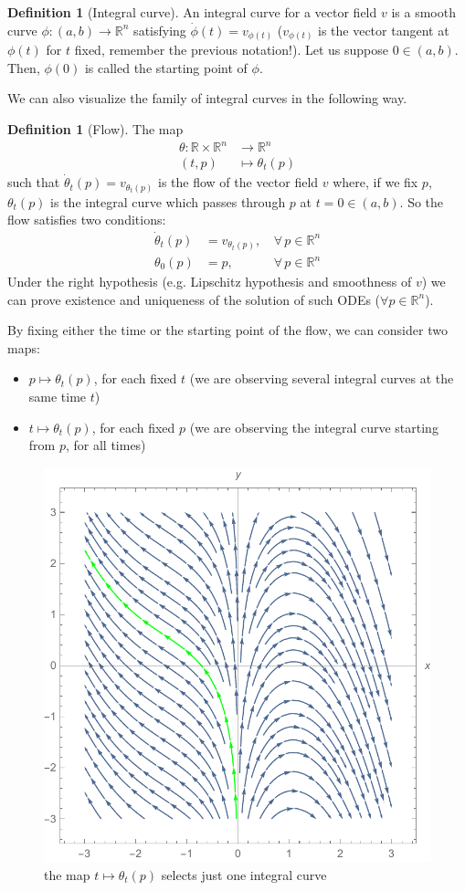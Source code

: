 \documentclass[a4paper,11pt,titlepage]{article}
\numberwithin{equation}{section}
\theoremstyle{definition}
\newtheorem{definition}[theorem]{Definition}
\theoremstyle{remark}
\newcommand{\rfield}{\mathbb{R}}
\begin{document}
\begin{definition}[Integral curve]
  An integral curve for a vector field $v$ is a smooth curve $\phi \colon (a, b) \rightarrow \rfield^n$ satisfying $\dot\phi(t) = v_{\phi(t)}$ ($v_{\phi(t)}$ is the vector tangent at $\phi(t)$ for $t$ fixed, remember the previous notation!). Let us suppose $0 \in (a, b)$. Then, $\phi(0)$ is called the starting point of $\phi$.
\end{definition}

We can also visualize the family of integral curves in the following way.

\begin{definition}[Flow]
  The map
  \begin{align}
    \theta \colon \rfield \times \rfield^n &\rightarrow \rfield^n \\
    (t, p) &\mapsto \theta_t(p) \nonumber
  \end{align}
  such that $\dot\theta_t(p) = v_{\theta_t(p)}$ is the flow of the vector field $v$ where, if we fix $p$, $\theta_t(p)$ is the integral curve which passes through $p$ at $t=0 \in (a, b)$.
  So the flow satisfies two conditions:
  \begin{align}
    \dot\theta_t(p) &= v_{\theta_t(p)} , \, &\forall \, p \in \rfield^n \\
    \theta_0(p) &= p, \, &\forall \, p \in \rfield^n
  \end{align}
Under the right hypothesis (e.g. Lipschitz hypothesis and smoothness of $v$) we can prove existence and uniqueness of the solution of such ODEs ($\forall p \in \rfield^n$).

By fixing either the time or the starting point of the flow, we can consider two maps:
\begin{itemize}
\item $p \mapsto \theta_t(p)$, for each fixed $t$ (we are observing several integral curves at the same time $t$)
\item $t \mapsto \theta_t(p)$, for each fixed $p$ (we are observing the integral curve starting from $p$, for all times)
\end{itemize}
\begin{figure}[h]
     \centering
     \includegraphics[width=.6\linewidth]{images/integralcurve_1.pdf}
     \caption{the map $t \mapsto \theta_t(p)$ selects just one integral curve} \label{Fig:integralcurve_1}
\end{figure}
\end{definition}
\end{document}
